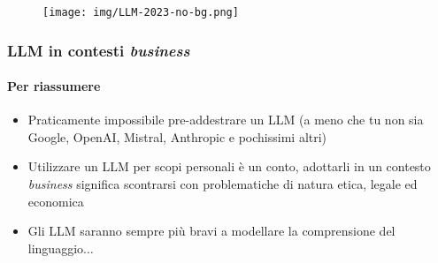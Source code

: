 \begin{frame}[t]
{\begin{minipage}[b]{\textwidth}
{\begin{figure}
                \centering
                \texttt{[image: img/LLM-2023-no-bg.png]}
            \end{figure}
        }
    \end{minipage}
}
\end{frame}
%
\begin{frame}[t] \frametitle{LLM in contesti \emph{business}}
\framesubtitle{Per riassumere}
{\footnotesize
{}
    \begin{minipage}[t]{\textwidth}
        \begin{itemize}[leftmargin=10pt,align=right]
            \item[\alert{\faArrowCircleRight}] Praticamente impossibile pre-addestrare un LLM (a meno che tu non sia Google, OpenAI, Mistral, Anthropic e pochissimi altri)
            \item[\alert{\faArrowCircleRight}] Utilizzare un LLM per scopi personali è un conto, adottarli in un contesto \emph{business} significa scontrarsi con problematiche di natura etica, legale ed economica
            \item[\alert{\faArrowCircleRight}] Gli LLM saranno sempre più bravi a modellare la comprensione del linguaggio$\ldots$
        \end{itemize}
        \vspace*{.5cm}
    \end{minipage}
}
\end{frame}